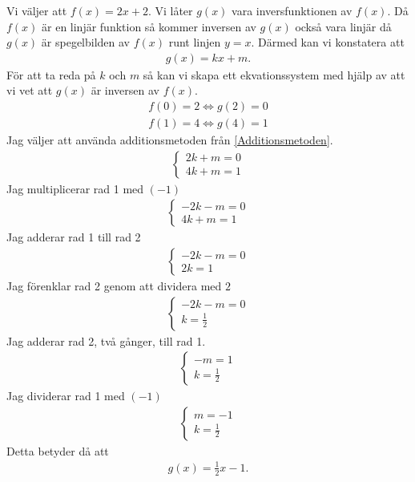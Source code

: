 Vi väljer att $f(x) = 2x + 2$. Vi låter $g(x)$ vara inversfunktionen av $f(x)$. Då $f(x)$ är en linjär funktion så kommer inversen av $g(x)$ också vara linjär då $g(x)$ är spegelbilden av $f(x)$ runt linjen $y=x$. Därmed kan vi konstatera att
\begin{align*}
	g(x)=kx+m.
\end{align*}
För att ta reda på $k$ och $m$ så kan vi skapa ett ekvationssystem med hjälp av att vi vet att $g(x)$ är inversen av $f(x)$.
\begin{align*}
	f(0) = 2 \Leftrightarrow g(2) = 0 \\
	f(1)=4 \Leftrightarrow g(4)=1
\end{align*}
Jag väljer att använda additionsmetoden från \ref{Additionsmetoden}.
\begin{align*}
	\begin{cases}
		2k+m = 0 \\
		4k+m = 1
	\end{cases}
\end{align*}
Jag multiplicerar rad 1 med $(-1)$
\begin{align*}
	\begin{cases}
		-2k-m = 0 \\
		4k+m = 1
	\end{cases}
\end{align*}
Jag adderar rad 1 till rad 2
\begin{align*}
	\begin{cases}
		-2k-m = 0 \\
		2k = 1
	\end{cases}
\end{align*}
Jag förenklar rad 2 genom att dividera med $2$
\begin{align*}
	\begin{cases}
		-2k-m = 0 \\
		k = \frac{1}{2}
	\end{cases}
\end{align*}
Jag adderar rad 2, två gånger, till rad 1.
\begin{align*}
	\begin{cases}
		-m = 1 \\
		k = \frac{1}{2}
	\end{cases}
\end{align*}
Jag dividerar rad 1 med $(-1)$
\begin{align*}
	\begin{cases}
		m = -1 \\
		k = \frac{1}{2}
	\end{cases}
\end{align*}
Detta betyder då att
\begin{align*}
	g(x) = \frac{1}{2}x-1.
\end{align*}

